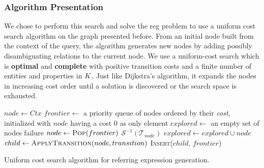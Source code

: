 \documentclass[a4paper,11pt,twoside]{StyleThese}
\begin{document}
\subsubsection{Algorithm Presentation}
We chose to perform this search and solve the \acrshort{reg} problem to use a uniform cost search algorithm on the graph presented before.
From an initial node built from the context of the query, the algorithm generates new nodes by adding possibly disambiguating relations to the current node. We use a uniform-cost search which is \textbf{optimal} and \textbf{complete} with positive transition costs and a finite number of entities and properties in $K$. Just like Dijkstra's algorithm, it expands the nodes in increasing cost order until a solution is discovered or the search space is exhausted.


\begin{algorithm}[htb]
\begin{algorithmic}[1]
\State $node \leftarrow Ctx$
\State $frontier \leftarrow$ a priority queue of nodes ordered by their \textit{cost}, initialized with $node$ having a cost 0 as only element
\State $explored \leftarrow$ an empty set of nodes
\Loop
		\State \Return failure		
	\EndIf
	\State $node \leftarrow \textsc{Pop}(frontier)$
		\State \Return $\mathcal{S}^{-1}(\mathcal{T}_{node})$
	\EndIf
	\State $explored \leftarrow explored \cup node$
		\State $child \leftarrow \textsc{ApplyTransition}(node, transition)$
			\State \textsc{Insert}($child$, $frontier$)
		\EndIf
	\EndFor
\EndLoop
\EndFunction
\end{algorithmic}
 \caption{Uniform cost search algorithm for referring expression generation.}
 \label{alg:reg}
\end{algorithm}
\end{document}
